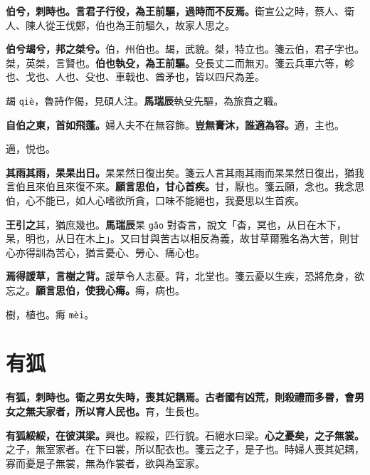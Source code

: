 
\textbf{伯兮，刺時也。言君子行役，為王前驅，過時而不反焉。}{\footnotesize 衛宣公之時，蔡人、衛人、陳人從王伐鄭，伯也為王前驅久，故家人思之。}

\textbf{伯兮朅兮，邦之桀兮。}{\footnotesize 伯，州伯也。朅，武貌。桀，特立也。箋云伯，君子字也。桀，英桀，言賢也。}\textbf{伯也執殳，為王前驅。}{\footnotesize 殳長丈二而無刃。箋云兵車六等，軫也、戈也、人也、殳也、車戟也、酋矛也，皆以四尺為差。}

\begin{quoting}朅 \texttt{qiè}，魯詩作偈，見碩人注。\textbf{馬瑞辰}執殳先驅，為旅賁之職。\end{quoting}

\textbf{自伯之東，首如飛蓬。}{\footnotesize 婦人夫不在無容飾。}\textbf{豈無膏沐，誰適為容。}{\footnotesize 適，主也。}

\begin{quoting}適，悦也。\end{quoting}

\textbf{其雨其雨，杲杲出日。}{\footnotesize 杲杲然日復出矣。箋云人言其雨其雨而杲杲然日復出，猶我言伯且來伯且來復不來。}\textbf{願言思伯，甘心首疾。}{\footnotesize 甘，厭也。箋云願，念也。我念思伯，心不能已，如人心嗜欲所貪，口味不能絕也，我憂思以生首疾。}

\begin{quoting}\textbf{王引之}其，猶庶幾也。\textbf{馬瑞辰}杲 \texttt{gǎo} 對杳言，說文「杳，冥也，从日在木下，杲，明也，从日在木上」。又曰甘與苦古以相反為義，故甘草爾雅名為大苦，則甘心亦得訓為苦心，猶言憂心、勞心、痛心也。\end{quoting}

\textbf{焉得諼草，言樹之背。}{\footnotesize 諼草令人志憂。背，北堂也。箋云憂以生疾，恐將危身，欲忘之。}\textbf{願言思伯，使我心痗。}{\footnotesize 痗，病也。}

\begin{quoting}樹，植也。痗 \texttt{mèi}。\end{quoting}

\section{有狐}


\textbf{有狐，刺時也。衛之男女失時，喪其妃耦焉。古者國有凶荒，則殺禮而多昬，會男女之無夫家者，所以育人民也。}{\footnotesize 育，生長也。}

\textbf{有狐綏綏，在彼淇梁。}{\footnotesize 興也。綏綏，匹行貌。石絕水曰梁。}\textbf{心之憂矣，之子無裳。}{\footnotesize 之子，無室家者。在下曰裳，所以配衣也。箋云之子，是子也。時婦人喪其妃耦，寡而憂是子無裳，無為作裳者，欲與為室家。}


